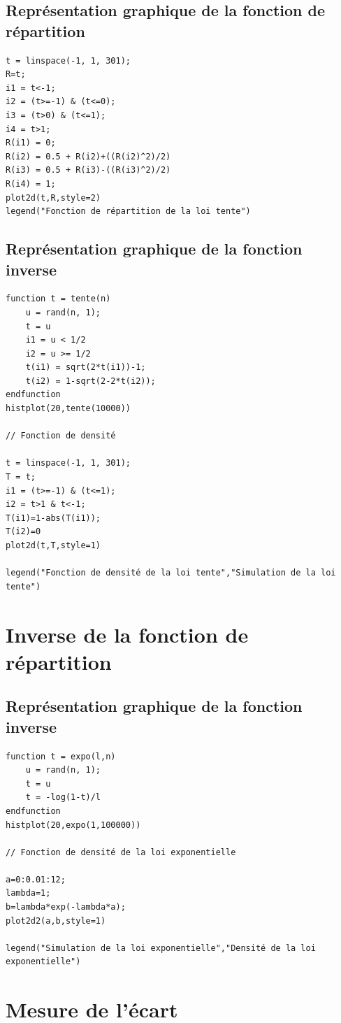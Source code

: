 \documentclass{article}
\begin{document}
\subsection{Représentation graphique de la fonction de répartition}
\begin{verbatim}
t = linspace(-1, 1, 301);
R=t;
i1 = t<-1;
i2 = (t>=-1) & (t<=0);
i3 = (t>0) & (t<=1);
i4 = t>1;
R(i1) = 0;
R(i2) = 0.5 + R(i2)+((R(i2)^2)/2)
R(i3) = 0.5 + R(i3)-((R(i3)^2)/2)
R(i4) = 1;
plot2d(t,R,style=2)
legend("Fonction de répartition de la loi tente")
\end{verbatim}

\subsection{Représentation graphique de la fonction inverse}
\begin{verbatim}
function t = tente(n)
    u = rand(n, 1);
    t = u
    i1 = u < 1/2
    i2 = u >= 1/2
    t(i1) = sqrt(2*t(i1))-1;
    t(i2) = 1-sqrt(2-2*t(i2));
endfunction
histplot(20,tente(10000))

// Fonction de densité 

t = linspace(-1, 1, 301);
T = t;
i1 = (t>=-1) & (t<=1);
i2 = t>1 & t<-1;
T(i1)=1-abs(T(i1));
T(i2)=0
plot2d(t,T,style=1)

legend("Fonction de densité de la loi tente","Simulation de la loi tente")
\end{verbatim}

\section{Inverse de la fonction de répartition}

\subsection{Représentation graphique de la fonction inverse}
\begin{verbatim}
function t = expo(l,n)
    u = rand(n, 1);
    t = u
    t = -log(1-t)/l 
endfunction
histplot(20,expo(1,100000))

// Fonction de densité de la loi exponentielle

a=0:0.01:12;
lambda=1;
b=lambda*exp(-lambda*a);
plot2d2(a,b,style=1)

legend("Simulation de la loi exponentielle","Densité de la loi exponentielle")
\end{verbatim}

\section{Mesure de l'écart}
\end{document}
